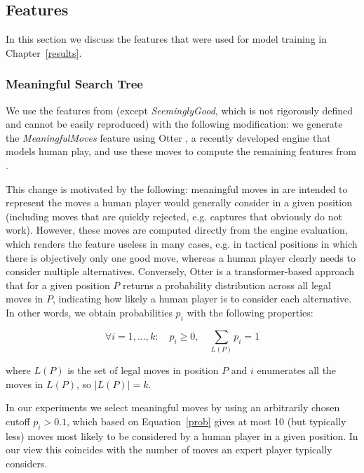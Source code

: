 \documentclass[sigconf,nonacm]{acmart}
\begin{document}
\subsection{Features}
\label{features}

In this section we discuss the features that were used for model training in Chapter~\ref{results}.

\subsubsection{Meaningful Search Tree}

We use the features from \cite{bratko3} (except \textit{SeeminglyGood}, which is not rigorously defined and cannot be easily reproduced) with the following modification: we generate the \textit{MeaningfulMoves}  feature using Otter \cite{otter}, a recently developed engine that models human play, and use these moves to compute the remaining features from \cite{bratko3}. 

This change is motivated by the following: meaningful moves in \cite{bratko3} are intended to represent the moves a human player would generally consider in a given position (including moves that are quickly rejected, e.g. captures that obviously do not work). However, these moves are computed directly from the engine evaluation, which renders the feature useless in many cases, e.g. in tactical positions in which there is objectively only one good move, whereas a human player clearly needs to consider multiple alternatives. Conversely, Otter \cite{otter} is a transformer-based approach that for a given position $P$ returns a probability distribution across all legal moves in $P$, indicating how likely a human player is to consider each alternative. In other words, we obtain probabilities $p_i$ with the following properties:

\begin{equation}
\label{prob}
\forall i=1,\dots,k:\quad p_i\geq0, \quad\sum_{L(P)}p_i=1
\end{equation}

\noindent
where $L(P)$ is the set of legal moves in position $P$ and $i$ enumerates all the moves in $L(P)$, so $|L(P)|=k$. 

In our experiments we select meaningful moves by using an arbitrarily chosen cutoff $p_i>0.1$, which based on Equation~\eqref{prob} gives at most 10 (but typically less) moves most likely to be considered by a human player in a given position. In our view this coincides with the number of moves an expert player typically considers. 
\end{document}

